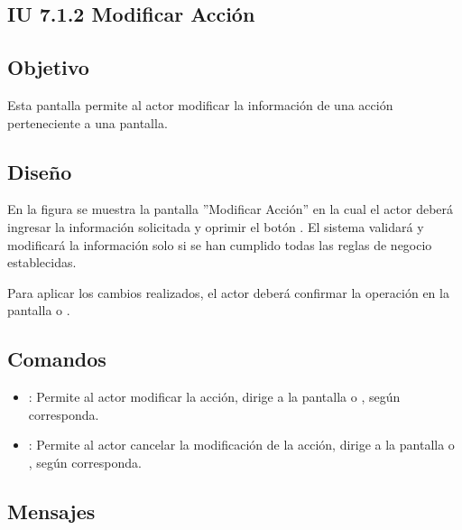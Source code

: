\subsection{IU 7.1.2 Modificar Acción}

\subsection{Objetivo}
	Esta pantalla permite al actor modificar la información de una acción perteneciente a una pantalla.
\subsection{Diseño}
	En la figura  se muestra la pantalla ''Modificar Acción'' en la cual el actor deberá ingresar la información solicitada y oprimir el botón  . El sistema validará y modificará la información solo si se han cumplido todas las reglas de negocio establecidas.
	
	Para aplicar los cambios realizados, el actor deberá confirmar la operación en la pantalla  o .

\subsection{Comandos}
\begin{itemize}
	\item {}: Permite al actor modificar la acción, dirige a la pantalla  o , según corresponda.
	\item {}: Permite al actor cancelar la modificación de la acción, dirige a la pantalla  o , según corresponda.
\end{itemize}

\subsection{Mensajes}

